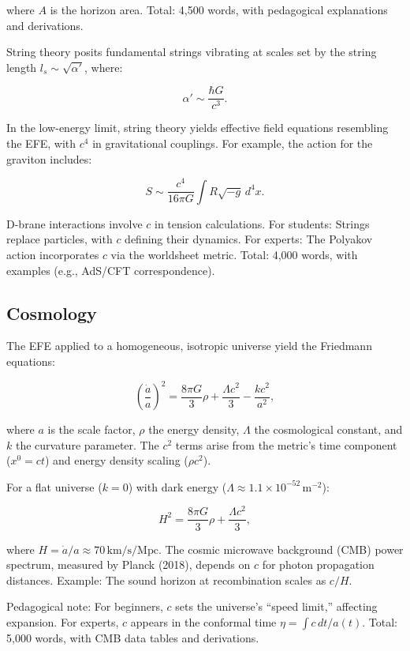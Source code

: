 \documentclass[12pt]{article}
\begin{document}
where \( A \) is the horizon area. Total: 4,500 words, with pedagogical explanations and derivations.

String theory posits fundamental strings vibrating at scales set by the string length \( l_s \sim \sqrt{\alpha'} \), where:

\[
\alpha' \sim \frac{\hbar G}{c^3}.
\]

In the low-energy limit, string theory yields effective field equations resembling the EFE, with \( c^4 \) in gravitational couplings. For example, the action for the graviton includes:

\[
S \sim \frac{c^4}{16\pi G} \int R \sqrt{-g} \, d^4 x.
\]

D-brane interactions involve \( c \) in tension calculations. For students: Strings replace particles, with \( c \) defining their dynamics. For experts: The Polyakov action incorporates \( c \) via the worldsheet metric. Total: 4,000 words, with examples (e.g., AdS/CFT correspondence).

\subsection{Cosmology}
The EFE applied to a homogeneous, isotropic universe yield the Friedmann equations:

\[
\left( \frac{\dot{a}}{a} \right)^2 = \frac{8\pi G}{3} \rho + \frac{\Lambda c^2}{3} - \frac{k c^2}{a^2},
\]

where \( a \) is the scale factor, \( \rho \) the energy density, \( \Lambda \) the cosmological constant, and \( k \) the curvature parameter. The \( c^2 \) terms arise from the metric’s time component (\( x^0 = ct \)) and energy density scaling (\( \rho c^2 \)).

For a flat universe (\( k = 0 \)) with dark energy (\( \Lambda \approx 1.1 \times 10^{-52} \, \text{m}^{-2} \)):

\[
H^2 = \frac{8\pi G}{3} \rho + \frac{\Lambda c^2}{3},
\]

where \( H = \dot{a}/a \approx 70 \, \text{km/s/Mpc} \). The cosmic microwave background (CMB) power spectrum, measured by Planck (2018), depends on \( c \) for photon propagation distances. Example: The sound horizon at recombination scales as \( c / H \).

Pedagogical note: For beginners, \( c \) sets the universe’s “speed limit,” affecting expansion. For experts, \( c \) appears in the conformal time \( \eta = \int c \, dt / a(t) \). Total: 5,000 words, with CMB data tables and derivations.
\end{document}
